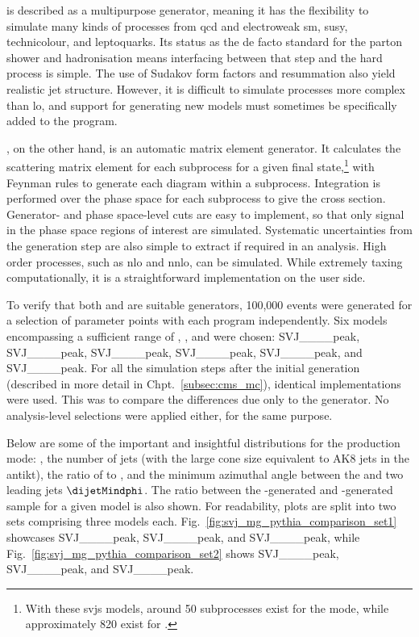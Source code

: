 
\PYTHIAEIGHT is described as a multipurpose generator, meaning it has the flexibility to simulate many kinds of processes from \acrshort{qcd} and electroweak \acrshort{sm}, \acrshort{susy}, technicolour, and leptoquarks. Its status as the de facto standard for the parton shower and hadronisation means interfacing between that step and the hard process is simple. The use of Sudakov form factors and resummation also yield realistic jet structure. However, it is difficult to simulate processes more complex than \acrshort{lo}, and support for generating new models must sometimes be specifically added to the program.

\MGvATNLO, on the other hand, is an automatic matrix element generator. It calculates the scattering matrix element for each subprocess for a given final state,\footnote{With these \glspl{svj} models, around 50 subprocesses exist for the \schannel mode, while approximately 820 exist for \tchannel.} with Feynman rules to generate each diagram within a subprocess. Integration is performed over the phase space for each subprocess to give the cross section. Generator- and phase space-level cuts are easy to implement, so that only signal in the phase space regions of interest are simulated. Systematic uncertainties from the generation step are also simple to extract if required in an analysis. High order processes, such as \acrshort{nlo} and \acrshort{nnlo}, can be simulated. While extremely taxing computationally, it is a straightforward implementation on the user side.

To verify that both \PYTHIA and \MADGRAPH are suitable generators, 100,000 events were generated for a selection of parameter points with each program independently. Six models encompassing a sufficient range of \mZprime, \mDark, and \rinv were chosen: SVJ\_\_\_\_\-peak, SVJ\_\_\_\_peak, SVJ\_\_\_\_\-peak, SVJ\_\_\_\_\-peak, SVJ\_\_\_\_\-peak, and SVJ\_\_\_\_\-peak. For all the simulation steps after the initial generation (described in more detail in Chpt.~\ref{subsec:cms_mc}), identical implementations were used. This was to compare the differences due only to the generator. No analysis-level selections were applied either, for the same purpose.

Below are some of the important and insightful distributions for the \schannel production mode: \mT, the number of \glspl{jet} (with the large cone size equivalent to AK8 \glspl{jet} in the \gls{antikt}), the ratio of \ptmiss to \mT, and the minimum azimuthal angle between the \ptmiss and two leading \glspl{jet} $\dijetMindphi$. The ratio between the \MADGRAPH-generated and \PYTHIA-generated sample for a given model is also shown. For readability, plots are split into two sets comprising three models each. Fig.~\ref{fig:svj_mg_pythia_comparison_set1} showcases SVJ\_\_\_\_\-peak, SVJ\_\_\_\_\-peak, and SVJ\_\_\_\_\-peak, while Fig.~\ref{fig:svj_mg_pythia_comparison_set2} shows SVJ\_\_\_\_\-peak, SVJ\_\_\_\_\-peak, and SVJ\_\_\_\_\-peak.

